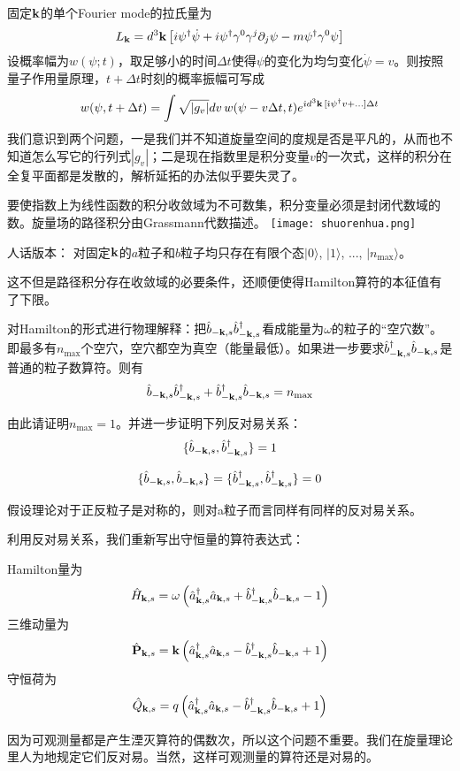\documentclass[CJK]{beamer}
\begin{document}
\begin{frame}
\bch
固定${\mathbf{k}}$的单个Fourier mode的拉氏量为
$$L_{\mathbf{k}} = d^3{\mathbf{k}} \left[ i\psi^\dagger\dot\psi + i\psi^\dagger\gamma^0\gamma^j\partial_j\psi - m \psi^\dagger\gamma^0 \psi \right]$$
设概率幅为$w(\psi;t)$，取足够小的时间$\Delta t$使得$\psi$的变化为均匀变化$\dot\psi = v$。则按照量子作用量原理，$t+\Delta t$时刻的概率振幅可写成
$$w(\psi, t+\Delta t) = \int \sqrt{|g_v|}dv\, w(\psi - v \Delta t, t) e^{{\dot{\imath}} d^3{\mathbf{k}}\,[{\dot{\imath}}\psi^\dagger v + \ldots]\Delta t}$$
我们意识到两个问题，一是我们并不知道旋量空间的度规是否是平凡的，从而也不知道怎么写它的行列式$|g_v|$；二是现在指数里是积分变量$v$的一次式，这样的积分在全复平面都是发散的，解析延拓的办法似乎要失灵了。
\ech
\end{frame}


\begin{frame}
\bch
要使指数上为线性函数的积分收敛域为不可数集，积分变量必须是封闭代数域的数。旋量场的路径积分由Grassmann代数描述。
\texttt{[image: shuorenhua.png]}

\ech
\end{frame}



\begin{frame}
\bch
人话版本： 对固定${\mathbf{k}}$的$a$粒子和$b$粒子均只存在有限个态$|0\rangle$, $|1\rangle$, ..., $|n_{\max}\rangle$。

\skipline
\skipline
\skipline
这不但是路径积分存在收敛域的必要条件，还顺便使得Hamilton算符的本征值有了下限。
\ech
\end{frame}


\begin{frame}
\bch
对Hamilton的形式进行物理解释：把${\hat{b}}_{-{\mathbf{k}},s}{\hat{b}^\dagger}_{-{\mathbf{k}},s}$看成能量为$\omega$的粒子的“空穴数”。即最多有$n_{\max}$个空穴，空穴都空为真空（能量最低）。如果进一步要求${\hat{b}^\dagger}_{-{\mathbf{k}},s}{\hat{b}}_{-{\mathbf{k}},s}$是普通的粒子数算符。则有
$${\hat{b}}_{-{\mathbf{k}},s}{\hat{b}^\dagger}_{-{\mathbf{k}},s} + {\hat{b}^\dagger}_{-{\mathbf{k}},s}{\hat{b}}_{-{\mathbf{k}},s} = n_{\max}$$ 

由此请证明$n_{\max} = 1$。并进一步证明下列反对易关系：
$$\{{\hat{b}}_{-{\mathbf{k}},s},{\hat{b}^\dagger}_{-{\mathbf{k}},s}\} = 1$$

$$\{{\hat{b}}_{-{\mathbf{k}},s}, {\hat{b}}_{-{\mathbf{k}},s} \} = \{ {\hat{b}^\dagger}_{-{\mathbf{k}},s}, {\hat{b}^\dagger}_{-{\mathbf{k}},s}\} = 0$$

假设理论对于正反粒子是对称的，则对a粒子而言同样有同样的反对易关系。
\ech
\end{frame}


\begin{frame}
\bch
利用反对易关系，我们重新写出守恒量的算符表达式：

Hamilton量为
$$\hat{H}_{{\mathbf{k}},s} =  \omega\left({\hat{a}^\dagger}_{{\mathbf{k}},s}{\hat{a}}_{{\mathbf{k}},s} + {\hat{b}^\dagger}_{-{\mathbf{k}},s}{\hat{b}}_{-{\mathbf{k}},s} -1\right)$$
三维动量为
$$\hat{\mathbf{P}}_{{\mathbf{k}},s} =  {\mathbf{k}}\left({\hat{a}^\dagger}_{{\mathbf{k}},s}{\hat{a}}_{{\mathbf{k}},s} - {\hat{b}^\dagger}_{-{\mathbf{k}},s}{\hat{b}}_{-{\mathbf{k}},s} + 1 \right)$$
守恒荷为
$$\hat{Q}_{{\mathbf{k}},s} =  q\left({\hat{a}^\dagger}_{{\mathbf{k}},s}{\hat{a}}_{{\mathbf{k}},s} - {\hat{b}^\dagger}_{-{\mathbf{k}},s}{\hat{b}}_{-{\mathbf{k}},s} + 1 \right)$$

\ech
\end{frame}

\begin{frame}
\bch

因为可观测量都是产生湮灭算符的偶数次，所以这个问题不重要。我们在旋量理论里人为地规定它们反对易。当然，这样可观测量的算符还是对易的。
\ech
\end{frame}
\end{document}
